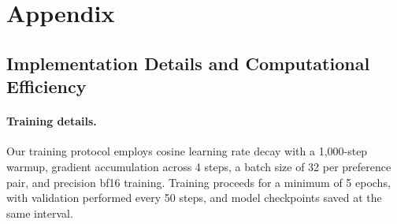 \newpage
\appendix
\section{Appendix}

\subsection{Implementation Details and Computational Efficiency}
\label{subsec:implementation}

\paragraph{Training details.} Our training protocol employs cosine learning rate decay with a 1,000-step warmup, gradient accumulation across 4 steps, a batch size of 32 per preference pair, and precision bf16 training. Training proceeds for a minimum of 5 epochs, with validation performed every 50 steps, and model checkpoints saved at the same interval.

